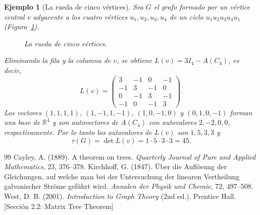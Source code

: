 \documentclass[12pt,a4paper]{article}
\theoremstyle{profesional}
\theoremstyle{definicion-style}
\newtheorem{ejemplo}[teorema]{Ejemplo}
\theoremstyle{observacion-style}
\newcommand{\R}{\mathbb{R}}
\begin{document}
\begin{ejemplo}[La rueda de cinco vértices]
    Sea \( G \) el grafo formado por un vértice central \( v \) adyacente a los cuatro vértices \( u_1, u_2, u_3, u_4 \) de un ciclo \( u_1u_2u_3u_4u_1 \) (Figura~\ref{fig:rueda}).

    \begin{figure}[ht]
        \centering
        \caption{La rueda de cinco vértices.}\label{fig:rueda}
    \end{figure}

    Eliminando la fila y la columna de \( v \), se obtiene \( L(v) = 3 I_4 - A(C_4) \), es decir,
    \[
        L(v) = \begin{pmatrix}
            3  & -1 & 0  & -1 \\
            -1 & 3  & -1 & 0  \\
            0  & -1 & 3  & -1 \\
            -1 & 0  & -1 & 3
        \end{pmatrix}.
    \]
    Los vectores \( (1,1,1,1) \), \( (1,-1,1,-1) \), \( (1,0,-1,0) \) y \( (0,1,0,-1) \) forman una base de \( \R^4 \) y son autovectores de \( A(C_4) \) con autovalores \( 2, -2, 0, 0 \), respectivamente. Por lo tanto los autovalores de \( L(v) \) son \( 1, 5, 3, 3 \) y
    \[
        \tau(G) = \det L(v) = 1 \cdot 5 \cdot 3 \cdot 3 = 45.
    \]
\end{ejemplo}

\newpage
\renewcommand{\refname}{Referencias Bibliográficas}

\begin{thebibliography}{99}
     Cayley, A. (1889). A theorem on trees. \textit{Quarterly Journal of Pure and Applied Mathematics}, 23, 376--378.
     Kirchhoff, G. (1847). Über die Auflösung der Gleichungen, auf welche man bei der Untersuchung der linearen Vertheilung galvanischer Ströme geführt wird. \textit{Annalen der Physik und Chemie}, 72, 497--508.
     West, D. B. (2001). \textit{Introduction to Graph Theory} (2nd ed.). Prentice Hall. [Sección 2.2: Matrix Tree Theorem]
\end{thebibliography}
\end{document}
